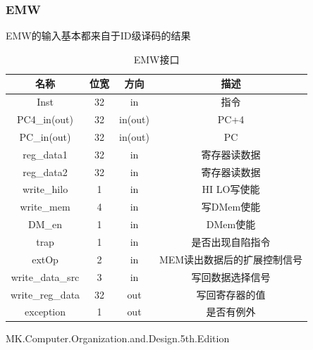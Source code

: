 \documentclass[UTF8]{ctexart}
\begin{document}
\subsubsection{EMW}
EMW的输入基本都来自于ID级译码的结果
\begin{table}[h]
    \centering
    \begin{tabular}{|c|c|c|c|}
        \hline  
        名称 & 位宽 & 方向 & 描述 \\ \hline
        Inst & 32 & in & 指令 \\ \hline
        PC4\_in(out) & 32 & in(out) & PC+4 \\ \hline
        PC\_in(out) & 32 & in(out) & PC  \\ \hline
        reg\_data1 & 32 & in & 寄存器读数据 \\ \hline 
        reg\_data2 & 32 & in & 寄存器读数据 \\ \hline
        write\_hilo & 1 & in & HI LO写使能 \\ \hline
        write\_mem & 4 & in & 写DMem使能 \\ \hline
        DM\_en & 1 & in & DMem使能 \\ \hline
        trap & 1 & in & 是否出现自陷指令 \\ \hline 
        extOp & 2 & in & MEM读出数据后的扩展控制信号 \\ \hline 
        write\_data\_src & 3 & in & 写回数据选择信号 \\ \hline
        write\_reg\_data & 32 & out & 写回寄存器的值 \\ \hline 
        exception & 1  &out & 是否有例外 \\ \hline
    \end{tabular}
    \caption{EMW接口}
\end{table}
\appendix

\newpage
\begin{thebibliography}{9}
    MK.Computer.Organization.and.Design.5th.Edition
\end{thebibliography}
\end{document}
